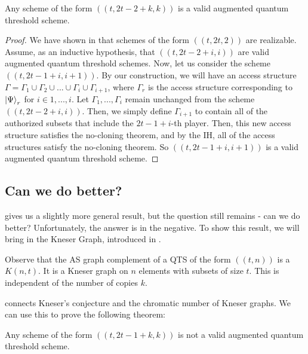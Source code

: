 \begin{theorem}
    \label{thm:build-scheme} 
    Any scheme of the form $((t,2t-2+k,k))$ is a valid augmented quantum threshold scheme.
\end{theorem}

\begin{proof}
    We have shown in  that schemes of the form $((t, 2t, 2))$ are realizable. Assume, as an inductive hypothesis, that $((t, 2t - 2 + i, i))$ are valid augmented quantum threshold schemes. Now, let us consider the scheme $((t, 2t-1+i, i+1))$. By our construction, we will have an access structure $\Gamma = \Gamma_1 \cup \Gamma_2 \cup ... \cup \Gamma_i \cup \Gamma_{i+1}$, where $\Gamma_r$ is the access structure corresponding to $\ket{\Psi}_r$ for $i \in {1,...,i}$. Let $\Gamma_1, ..., \Gamma_i$ remain unchanged from the scheme $((t, 2t - 2 + i, i))$. Then, we simply define $\Gamma_{i+1}$ to contain all of the authorized subsets that include the $2t-1+i$-th player. Then, this new access structure satisfies the no-cloning theorem, and by the IH, all of the access structures satisfy the no-cloning theorem. So $((t, 2t-1+i, i+1))$ is a valid augmented quantum threshold scheme.
\end{proof}

\subsection{Can we do better?}
\label{ssec:better}

 gives us a slightly more general result, but the question still remains - can we do better? Unfortunately, the answer is in the negative. To show this result, we will bring in the Kneser Graph, introduced in .

\begin{remark}
    Observe that the AS graph complement of a QTS of the form $((t,n))$ is a $K(n,t)$. It is a Kneser graph on $n$ elements with subsets of size $t$. This is independent of the number of copies $k$.
\end{remark}

 connects Kneser's conjecture and the chromatic number of Kneser graphs. We can use this to prove the following theorem:

\begin{theorem}
    \label{thm:no-more} 
    Any scheme of the form $((t,2t-1+k,k))$ is not a valid augmented quantum threshold scheme.
\end{theorem}

